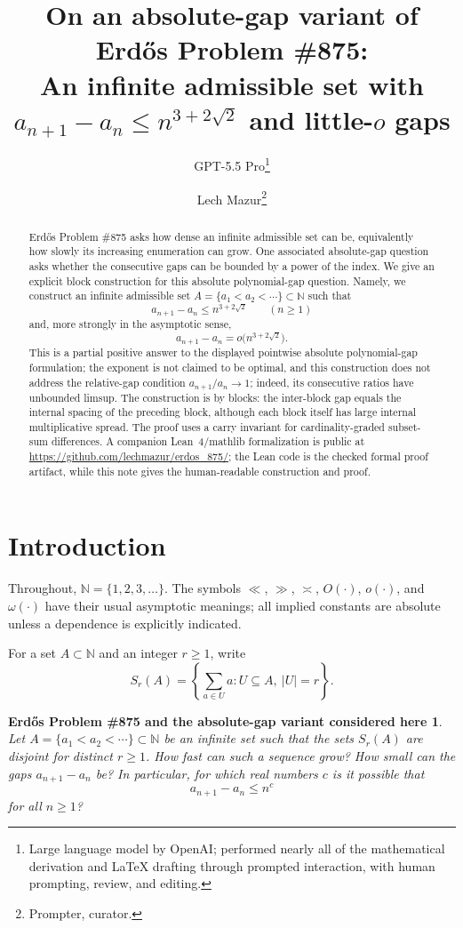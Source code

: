 \documentclass[11pt]{article}
\title{On an absolute-gap variant of Erd\H{o}s Problem \#875:\\
An infinite admissible set with $a_{n+1}-a_n\le n^{3+2\sqrt2}$ and little-$o$ gaps}
\author{GPT-5.5 Pro\thanks{Large language model by OpenAI; performed nearly all of the mathematical derivation and LaTeX drafting through prompted interaction, with human prompting, review, and editing.}
\and
Lech Mazur\thanks{Prompter, curator.}}
\date{}
\newtheorem*{problem875}{Erd\H{o}s Problem \#875 and the absolute-gap variant considered here}
\newcommand{\N}{\mathbb{N}}
\begin{document}
\maketitle

\begin{abstract}
Erd\H{o}s Problem \#875 asks how dense an infinite admissible set can be, equivalently how slowly its increasing enumeration can grow.  One associated absolute-gap question asks whether the consecutive gaps can be bounded by a power of the index.  We give an explicit block construction for this absolute polynomial-gap question.  Namely, we construct an infinite admissible set $A=\{a_1<a_2<\cdots\}\subset\N$ such that
\[
        a_{n+1}-a_n\le n^{3+2\sqrt2}\qquad(n\ge1)
\]
and, more strongly in the asymptotic sense,
\[
        a_{n+1}-a_n=o\bigl(n^{3+2\sqrt2}\bigr).
\]
This is a partial positive answer to the displayed pointwise absolute polynomial-gap formulation; the exponent is not claimed to be optimal, and this construction does not address the relative-gap condition $a_{n+1}/a_n\to1$; indeed, its consecutive ratios have unbounded limsup.  The construction is by blocks: the inter-block gap equals the internal spacing of the preceding block, although each block itself has large internal multiplicative spread.  The proof uses a carry invariant for cardinality-graded subset-sum differences.  A companion Lean~4/mathlib formalization is public at \url{https://github.com/lechmazur/erdos_875/}; the Lean code is the checked formal proof artifact, while this note gives the human-readable construction and proof.
\end{abstract}

\section{Introduction}

Throughout, $\N=\{1,2,3,\ldots\}$.  The symbols $\ll$, $\gg$, $\asymp$, $O(\cdot)$, $o(\cdot)$, and $\omega(\cdot)$ have their usual asymptotic meanings; all implied constants are absolute unless a dependence is explicitly indicated.

For a set $A\subset\N$ and an integer $r\ge1$, write
\[
        S_r(A)=\left\{\sum_{a\in U}a: U\subseteq A,\ |U|=r\right\}.
\]

\begin{problem875}
Let $A=\{a_1<a_2<\cdots\}\subset\N$ be an infinite set such that the sets $S_r(A)$ are disjoint for distinct $r\ge1$.  How fast can such a sequence grow?  How small can the gaps $a_{n+1}-a_n$ be?  In particular, for which real numbers $c$ is it possible that
\[
        a_{n+1}-a_n\le n^c
\]
for all $n\ge1$?
\end{problem875}
\end{document}
